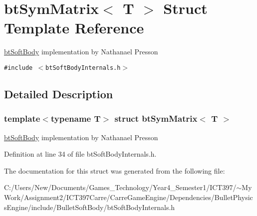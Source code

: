 \hypertarget{structbt_sym_matrix}{
\section{btSymMatrix$<$ T $>$ Struct Template Reference}
\label{structbt_sym_matrix}
}
\hyperlink{classbt_soft_body}{btSoftBody} implementation by Nathanael Presson  


{\tt \#include $<$btSoftBodyInternals.h$>$}



\subsection{Detailed Description}
\subsubsection*{template$<$typename T$>$ struct btSymMatrix$<$ T $>$}

\hyperlink{classbt_soft_body}{btSoftBody} implementation by Nathanael Presson 

Definition at line 34 of file btSoftBodyInternals.h.

The documentation for this struct was generated from the following file:\begin{CompactItemize}
\item 
C:/Users/New/Documents/Games\_\-Technology/Year4\_\-Semester1/ICT397/$\sim$My Work/Assignment2/ICT397Carre/CarreGameEngine/Dependencies/BulletPhysicsEngine/include/BulletSoftBody/btSoftBodyInternals.h\end{CompactItemize}
